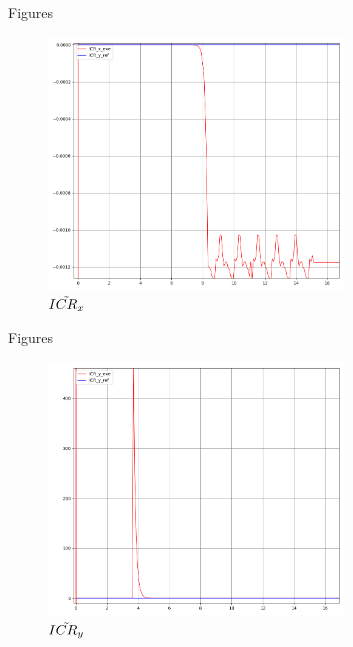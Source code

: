 \documentclass[10pt]{beamer}
\begin{document}
\begin{frame}{Figures}
\begin{figure}[!h]
    \centering
    \includegraphics[width=0.7\textwidth]{Figure/PR_ICR_x.png}
    \caption{$\Tilde{ICR_x}$ }
    \label{fig:PR_ICRx}
\end{figure}
\end{frame}
\begin{frame}{Figures}
    
\begin{figure}[!h]
    \centering
    \includegraphics[width=0.7\textwidth]{Figure/PR_ICR_y.png}
    \caption{$\Tilde{ICR_y}$ }
    \label{fig:PR_ICRy}
\end{figure}
\end{frame}
\end{document}
